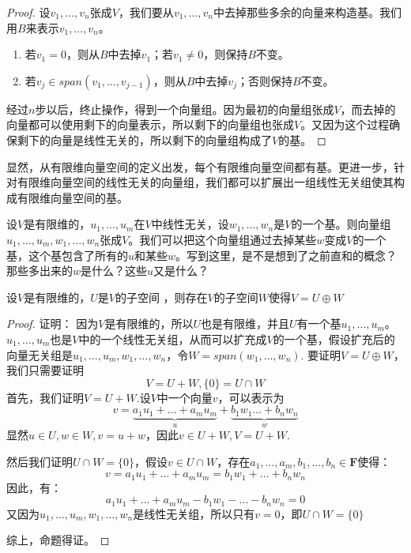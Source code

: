 \documentclass[10pt,a4paper,UTF8]{article}
\begin{document}
\begin{proof}
设\(v_{1},\ldots ,v_{n}\)张成\(V\)，我们要从\(v_{1},\ldots ,v_{n}\)中去掉那些多余的向量来构造基。我们用\(B\)来表示\(v_{1},\ldots ,v_{n}\)。

\begin{enumerate}
\item 若\(v_{1} = 0\)，则从\(B\)中去掉\(v_{1}\)；若\(v_{1} \neq 0\)，则保持\(B\)不变。
\item 若\(v_{j}\in span(v_{1},\ldots ,v_{j-1})\)，则从\(B\)中去掉\(v_{j}\)；否则保持\(B\)不变。
\end{enumerate}

经过\(n\)步以后，终止操作，得到一个向量组。因为最初的向量组张成\(V\)，而去掉的向量都可以使用剩下的向量表示，所以剩下的向量组也张成\(V\)。又因为这个过程确保剩下的向量是线性无关的，所以剩下的向量组构成了\(V\)的基。
\end{proof}
显然，从有限维向量空间的定义出发，每个有限维向量空间都有基。更进一步，针对有限维向量空间的线性无关的向量组，我们都可以扩展出一组线性无关组使其构成有限维向量空间的基。

设\(V\)是有限维的，\(u_{1},\ldots ,u_{m}\)在\(V\)中线性无关，设\(w_{1},\ldots ,w_{n}\)是\(V\)的一个基。则向量组\(u_{1},\ldots ,u_{m},w_{1},\ldots ,w_{n}\)张成\(V\)。我们可以把这个向量组通过去掉某些\(w\)变成\(V\)的一个基，这个基包含了所有的\(u\)和某些\(w\)。写到这里，是不是想到了之前直和的概念？那些多出来的\(w\)是什么？这些\(u\)又是什么？

\begin{theorem}
设\(V\)是有限维的，\(U\)是\(V\)的子空间 ，则存在\(V\)的子空间\(W\)使得\(V = U\oplus W\)
\end{theorem}

\begin{proof}
证明： 因为\(V\)是有限维的，所以\(U\)也是有限维，并且\(U\)有一个基\(u_{1},\ldots ,u_{m}\)。\(u_{1},\ldots ,u_{m}\)也是\(V\)中的一个线性无关组，从而可以扩充成\(V\)的一个基，假设扩充后的向量无关组是\(u_{1},\ldots ,u_{m},w_{1},\ldots ,w_{n}\)，令\(W = span(w_{1},\ldots ,w_{n})\). 要证明\(V = U \oplus W\)， 我们只需要证明\[V = U + W, \{0\} = U \cap W\] 首先，我们证明\(V = U + W\).设\(V\)中一个向量\(v\)，可以表示为\[v = \underbrace{a_{1}u_{1} + \ldots +a_{m}u_{m}}_{u} + \underbrace{b_{1}w_{1} \ldots  + b_{n}w_{n}}_{w}\] 显然\(u\in U, w\in W,v = u+w\)，因此\(v\in U + W, V = U+ W\).

然后我们证明\(U\cap W = \{0\}\)，假设\(v \in U\cap W\)，存在\(a_{1},\ldots ,a_{m},b_{1},\ldots ,b_{n} \in \mathbf{F}\)使得：
\[v = a_{1}u_{1} + \ldots + a_{m}u_{m} = b_{1}w_{1} + \ldots + b_{n}w_{n}\]
因此，有：
\[ a_{1}u_{1} + \ldots + a_{m}u_{m} - b_{1}w_{1} - \ldots - b_{n}w_{n} = 0\]
又因为\(u_{1},\ldots ,u_{m},w_{1},\ldots ,w_{n}\)是线性无关组，所以只有\(v=0\)，即\(U\cap W = \{0\}\)

综上，命题得证。
\end{proof}
\end{document}
